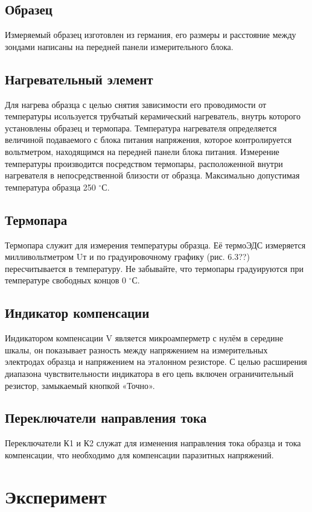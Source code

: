 \subsection{Образец}
Измеряемый образец изготовлен из германия, его размеры и расстояние между зондами написаны на передней панели измерительного блока.

\subsection{Нагревательный элемент}
Для нагрева образца с целью снятия зависимости его проводимости от температуры исользуется трубчатый керамический
нагреватель, внутрь которого установлены образец и термопара. Температура нагревателя определяется величиной подаваемого
с блока питания напряжения, которое контролируется вольтметром, находящимся на передней панели блока питания. Измерение
температуры производится посредством термопары, расположенной внутри нагревателя в непосредственной близости от образца.
Максимально допустимая температура образца 250 $^{\circ}$С.

\subsection{Термопара}
Термопара служит для измерения температуры образца. Её термоЭДС измеряется милливольтметром Uт и по градуировочному
графику (рис. 6.3??) пересчитывается в температуру. Не забывайте, что термопары градуируются при температуре свободных
концов 0 $^{\circ}$С.

\subsection{Индикатор компенсации}
Индикатором компенсации V является микроамперметр с нулём в середине шкалы, он показывает разность между напряжением на
измерительных электродах образца и напряжением на эталонном резисторе. С целью расширения диапазона чувствительности
индикатора в его цепь включен ограничительный резистор, замыкаемый кнопкой «Точно».

\subsection{Переключатели направления тока}
Переключатели К1 и К2 служат для изменения направления тока образца и тока компенсации, что необходимо для компенсации паразитных напряжений.

\section*{Эксперимент}
